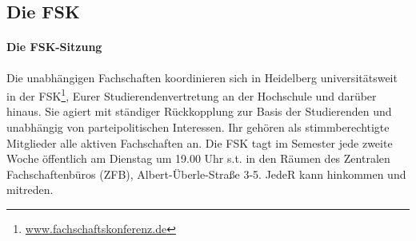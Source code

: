 \subsection{Die FSK}
\paragraph{Die FSK-Sitzung}

Die unabhängigen Fachschaften koordinieren sich in Heidelberg universitätsweit in der \gls{FSK}\footnote{\url{www.fachschaftskonferenz.de}}, Eurer Studierendenvertretung an der Hochschule und darüber hinaus. Sie agiert mit ständiger Rückkopplung zur Basis der Studierenden und unabhängig von parteipolitischen Interessen. Ihr gehören als stimmberechtigte Mitglieder alle aktiven Fachschaften an. Die \gls{FSK} tagt im Semester jede zweite Woche öffentlich am Dienstag um 19.00 Uhr \gls{s.t.} in den Räumen des Zentralen Fachschaftenbüros (ZFB), Albert-Überle-Straße 3-5. JedeR kann hinkommen und mitreden.

